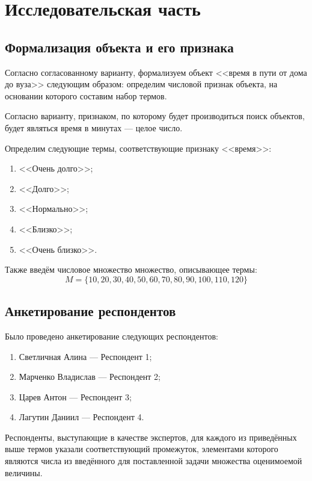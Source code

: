 \chapter{Исследовательская часть}

\section{Формализация объекта и его признака}
\label{formal}
Согласно согласованному варианту, формализуем объект <<время в пути от дома до вуза>> следующим образом: определим числовой признак объекта, на основании которого составим набор термов.

Согласно варианту, признаком, по которому будет производиться поиск объектов, будет являться время в минутах --- целое число.

Определим следующие термы, соответствующие признаку <<время>>:
\begin{enumerate}[label=\arabic*), itemindent=1em]
	\item <<Очень долго>>;
	\item <<Долго>>;
	\item <<Нормально>>;
	\item <<Близко>>;
	\item <<Очень близко>>.
\end{enumerate}

Также введём числовое множество множество, описывающее термы:
\begin{equation}
	\label{eq:h}
	M = \{10, 20, 30, 40, 50,60,70,80,90,100,110,120\}
\end{equation}
\newpage
\section{Анкетирование респондентов}

Было проведено анкетирование следующих респондентов:
\begin{enumerate}[label=\arabic*), itemindent=1em]
	\item Светличная Алина --- Респондент 1;
	\item Марченко Владислав --- Респондент 2;
	\item Царев Антон --- Респондент 3;
	\item Лагутин Даниил --- Респондент 4.
\end{enumerate}

Респонденты, выступающие в качестве экспертов, для каждого из приведённых выше термов указали соответствующий промежуток, элементами которого являются числа из введённого для поставленной задачи множества оценимоемой величины.

